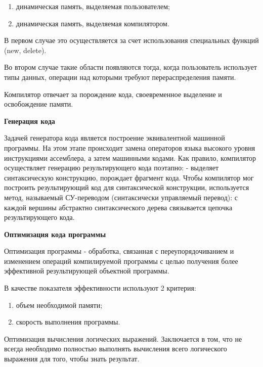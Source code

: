 \begin{enumerate}
  \item динамическая память, выделяемая пользователем;
  \item динамическая память, выделяемая компилятором.
\end{enumerate}

В первом случае это осуществляется за счет использования специальных функций (new, delete).

Во втором случае такие области появляются тогда, когда пользователь использует типы данных, операции над которыми требуют перераспределения памяти.

Компилятор отвечает за порождение кода, своевременное выделение и освобождение памяти.

\begin{center}{\bfseries Генерация кода}
\end{center}

Задачей генератора кода является построение эквивалентной машинной программы. На этом этапе происходит замена операторов языка высокого уровня инструкциями ассемблера, а затем машинными кодами. Как правило, компилятор осуществляет генерацию результирующего кода поэтапно: - выделяет синтаксическую конструкцию, порождает фрагмент кода. Чтобы компилятор мог построить результирующий код для синтаксической конструкции, используется метод, называемый СУ-переводом (синтаксически управляемый перевод): с каждой вершины абстрактно синтаксического дерева связывается цепочка результирующего кода.

\begin{center}{\bfseries Оптимизация кода программы}
\end{center}

\begin{opr}
  Оптимизация программы - обработка, связанная с переупорядочиванием и изменением операций компилируемой программы с целью получения более эффективной результирующей объектной программы. 
\end{opr}

В качестве показателя эффективности используют 2 критерия:

\begin{enumerate}
  \item объем необходимой памяти;
  \item скорость выполнения программы.
\end{enumerate}

Оптимизация вычисления логических выражений. Заключается в том, что не всегда необходимо полностью выполнять вычисления всего логического выражения для того, чтобы знать результат.

